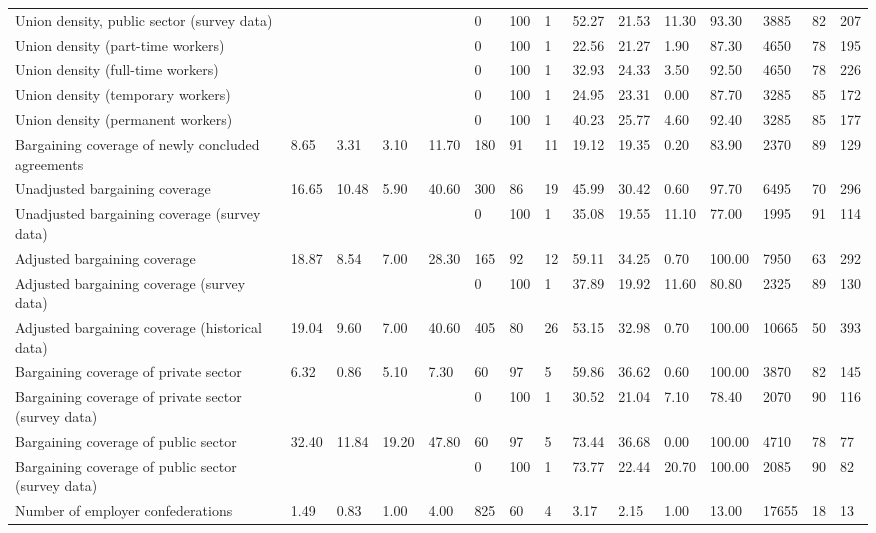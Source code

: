 \begin{longtable}{lllllllllllllll}
Union density, public sector (survey data) &  &  &  &  & 0 & 100 & 1 & 52.27 & 21.53 & 11.30 & 93.30 & 3885 & 82 & 207\\
Union density (part-time workers) &  &  &  &  & 0 & 100 & 1 & 22.56 & 21.27 & 1.90 & 87.30 & 4650 & 78 & 195\\
Union density (full-time workers) &  &  &  &  & 0 & 100 & 1 & 32.93 & 24.33 & 3.50 & 92.50 & 4650 & 78 & 226\\
Union density (temporary workers) &  &  &  &  & 0 & 100 & 1 & 24.95 & 23.31 & 0.00 & 87.70 & 3285 & 85 & 172\\
\addlinespace
Union density (permanent workers) &  &  &  &  & 0 & 100 & 1 & 40.23 & 25.77 & 4.60 & 92.40 & 3285 & 85 & 177\\
Bargaining coverage of newly concluded agreements & 8.65 & 3.31 & 3.10 & 11.70 & 180 & 91 & 11 & 19.12 & 19.35 & 0.20 & 83.90 & 2370 & 89 & 129\\
Unadjusted bargaining coverage & 16.65 & 10.48 & 5.90 & 40.60 & 300 & 86 & 19 & 45.99 & 30.42 & 0.60 & 97.70 & 6495 & 70 & 296\\
Unadjusted bargaining coverage (survey data) &  &  &  &  & 0 & 100 & 1 & 35.08 & 19.55 & 11.10 & 77.00 & 1995 & 91 & 114\\
Adjusted bargaining coverage & 18.87 & 8.54 & 7.00 & 28.30 & 165 & 92 & 12 & 59.11 & 34.25 & 0.70 & 100.00 & 7950 & 63 & 292\\
\addlinespace
Adjusted bargaining coverage (survey data) &  &  &  &  & 0 & 100 & 1 & 37.89 & 19.92 & 11.60 & 80.80 & 2325 & 89 & 130\\
Adjusted bargaining coverage (historical data) & 19.04 & 9.60 & 7.00 & 40.60 & 405 & 80 & 26 & 53.15 & 32.98 & 0.70 & 100.00 & 10665 & 50 & 393\\
Bargaining coverage of private sector & 6.32 & 0.86 & 5.10 & 7.30 & 60 & 97 & 5 & 59.86 & 36.62 & 0.60 & 100.00 & 3870 & 82 & 145\\
Bargaining coverage of private sector (survey data) &  &  &  &  & 0 & 100 & 1 & 30.52 & 21.04 & 7.10 & 78.40 & 2070 & 90 & 116\\
Bargaining coverage of public sector & 32.40 & 11.84 & 19.20 & 47.80 & 60 & 97 & 5 & 73.44 & 36.68 & 0.00 & 100.00 & 4710 & 78 & 77\\
\addlinespace
Bargaining coverage of public sector (survey data) &  &  &  &  & 0 & 100 & 1 & 73.77 & 22.44 & 20.70 & 100.00 & 2085 & 90 & 82\\
Number of employer confederations & 1.49 & 0.83 & 1.00 & 4.00 & 825 & 60 & 4 & 3.17 & 2.15 & 1.00 & 13.00 & 17655 & 18 & 13\\

\end{longtable}

